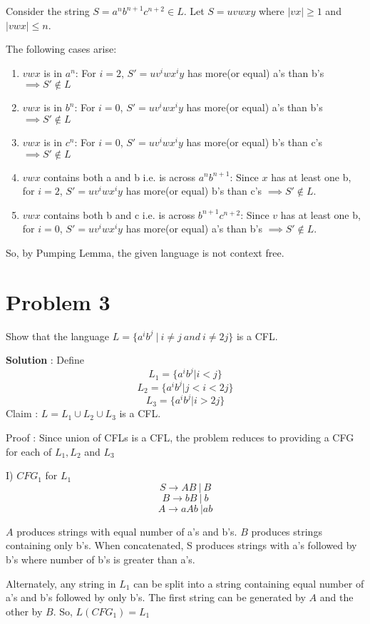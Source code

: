 \documentclass{article}
\begin{document}
    Consider the string $S = a^nb^{n+1}c^{n+2} \in L $. Let $S = uvwxy$ where $|vx|\geq 1$ and $|vwx| \leq n$.
    
    The following cases arise:
    \begin{enumerate}
        \item $vwx$ is in $a^n$: For $i=2$, $S' = uv^iwx^iy$ has more(or equal) a's than b's $\implies S' \notin L$ 
        \item $vwx$ is in $b^n$: For $i=0$, $S' = uv^iwx^iy$ has more(or equal) a's than b's $\implies S' \notin L$
        \item $vwx$ is in $c^n$: For $i=0$, $S' = uv^iwx^iy$ has more(or equal) b's than c's $\implies S' \notin L$
        \item $vwx$ contains both a and b i.e. is across $a^nb^{n+1}$: Since $x$ has at least one b,  for $i=2$, $S' = uv^iwx^iy$ has more(or equal) b's than c's $\implies S' \notin L$.
        \item $vwx$ contains both b and c i.e. is across $b^{n+1}c^{n+2}$: Since $v$ has at least one b,  for $i=0$, $S' = uv^iwx^iy$ has more(or equal) a's than b's $\implies S' \notin L$.
    \end{enumerate}
    So, by Pumping Lemma, the given language is not context free.
    
    \section*{Problem 3} Show that the language $L = \{a^ib^j~|~i\neq j \ and \ i\neq 2j\}$ is a CFL.
    
    \textbf{Solution} : Define
    $$L_1 =\{a^ib^j|i < j\}$$
    $$L_2 =\{a^ib^j|j < i < 2j\}$$
    $$L_3 =\{a^ib^j|i > 2j\}$$
    Claim : $L = L_1 \cup L_2 \cup L_3$ is a CFL.
    
    Proof : Since union of CFLs is a CFL, the problem reduces to providing a CFG for each of $L_1, L_2$ and $L_3$
    
    I) $CFG_1$ for $L_1$
    $$S \rightarrow AB\ | \ B$$
    $$B \rightarrow bB\ |\ b$$
    $$A \rightarrow aAb\ | ab$$
    
    \quad $A$ produces strings with equal number of a's and b's. $B$ produces strings containing only b's. When concatenated, S produces strings with a's followed by b's where number of b's is greater than a's. 
    
    \quad Alternately, any string in $L_1$ can be split into a string containing equal number of a's and b's followed by only b's. The first string can be generated by $A$ and the other by $B$. So, $L(CFG_1)  = L_1$
    
\end{document}
